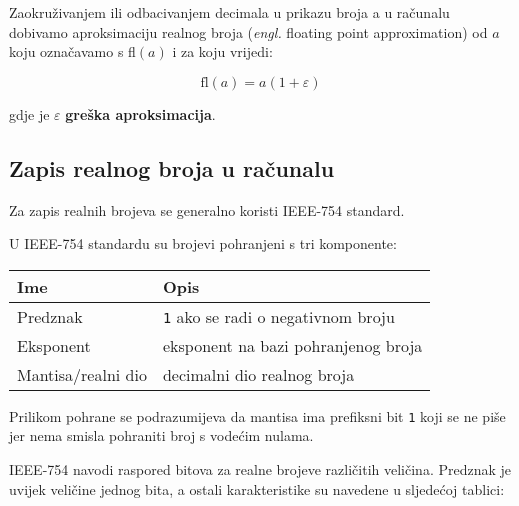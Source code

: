 Zaokruživanjem ili odbacivanjem decimala u prikazu broja a u računalu dobivamo aproksimaciju realnog broja (\textit{engl.} floating point approximation) od $a$ koju označavamo s fl$(a)$ i za koju vrijedi:

$$
\text{fl}(a) = a(1+\varepsilon)
$$

gdje je $\varepsilon$ \textbf{greška aproksimacija}.

\newpage

\subsection{Zapis realnog broja u računalu}

Za zapis realnih brojeva se generalno koristi IEEE-754 standard.

U IEEE-754 standardu su brojevi pohranjeni s tri komponente:

\begin{center}
    \begin{tabular}{|l|l|}
        \hline
        Ime&Opis\\
        \hline
        Predznak&\verb|1| ako se radi o negativnom broju\\
        Eksponent&eksponent na bazi pohranjenog broja\\
        Mantisa/realni dio&decimalni dio realnog broja\\
        \hline
    \end{tabular}
\end{center}

Prilikom pohrane se podrazumijeva da mantisa ima prefiksni bit \verb|1| koji se ne piše jer nema smisla pohraniti broj s vodećim nulama.

IEEE-754 navodi raspored bitova za realne brojeve različitih veličina. Predznak je uvijek veličine jednog bita, a ostali karakteristike su navedene u sljedećoj tablici:

